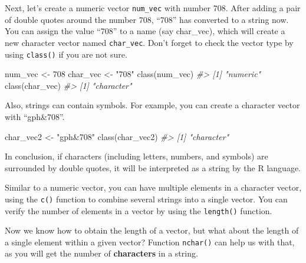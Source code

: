 \documentclass[
]{book}
\newenvironment{Shaded}{\begin{snugshade}}{\end{snugshade}}
\newcommand{\CommentTok}[1]{\textcolor[rgb]{0.56,0.35,0.01}{\textit{#1}}}
\newcommand{\DecValTok}[1]{\textcolor[rgb]{0.00,0.00,0.81}{#1}}
\newcommand{\FunctionTok}[1]{\textcolor[rgb]{0.00,0.00,0.00}{#1}}
\newcommand{\NormalTok}[1]{#1}
\newcommand{\OtherTok}[1]{\textcolor[rgb]{0.56,0.35,0.01}{#1}}
\newcommand{\StringTok}[1]{\textcolor[rgb]{0.31,0.60,0.02}{#1}}
\begin{document}
Next, let's create a numeric vector \texttt{num\_vec} with number 708. After adding a pair of double quotes around the number 708, ``708'' has converted to a string now. You can assign the value ``708'' to a name (say char\_vec), which will create a new character vector named \texttt{char\_vec}. Don't forget to check the vector type by using \texttt{class()} if you are not sure.

\begin{Shaded}
\begin{Highlighting}[]
\NormalTok{num\_vec }\OtherTok{\textless{}{-}} \DecValTok{708}
\NormalTok{char\_vec }\OtherTok{\textless{}{-}} \StringTok{"708"} 
\FunctionTok{class}\NormalTok{(num\_vec)}
\CommentTok{\#\textgreater{} [1] "numeric"}
\FunctionTok{class}\NormalTok{(char\_vec)}
\CommentTok{\#\textgreater{} [1] "character"}
\end{Highlighting}
\end{Shaded}

Also, strings can contain symbols. For example, you can create a character vector with ``gph\&708''.

\begin{Shaded}
\begin{Highlighting}[]
\NormalTok{char\_vec2 }\OtherTok{\textless{}{-}} \StringTok{"gph\&708"}
\FunctionTok{class}\NormalTok{(char\_vec2)}
\CommentTok{\#\textgreater{} [1] "character"}
\end{Highlighting}
\end{Shaded}

In conclusion, if characters (including letters, numbers, and symbols) are surrounded by double quotes, it will be interpreted as a string by the R language.

Similar to a numeric vector, you can have multiple elements in a character vector, using the \texttt{c()} function to combine several strings into a single vector. You can verify the number of elements in a vector by using the \texttt{length()} function.

Now we know how to obtain the length of a vector, but what about the length of a single element within a given vector? Function \texttt{nchar()} can help us with that, as you will get the number of \textbf{characters} in a string.

\begin{Shaded}
\end{Shaded}
\end{document}
